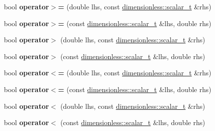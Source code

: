 \begin{DoxyCompactItemize}
\item 
\hypertarget{namespaceunits_a11d1606e46e95ed9fc8fd58019446e34}{}bool {\bfseries operator$>$=} (double lhs, const \hyperlink{classunits_1_1unit__t}{dimensionless\+::scalar\+\_\+t} \&rhs)\label{namespaceunits_a11d1606e46e95ed9fc8fd58019446e34}

\item 
\hypertarget{namespaceunits_ae5b1cb8ea6d39cdabe0216cbdd71f2a5}{}bool {\bfseries operator$>$=} (const \hyperlink{classunits_1_1unit__t}{dimensionless\+::scalar\+\_\+t} \&lhs, double rhs)\label{namespaceunits_ae5b1cb8ea6d39cdabe0216cbdd71f2a5}

\item 
\hypertarget{namespaceunits_a57fd46e74e12a209cfe126906f5ca39d}{}bool {\bfseries operator$>$} (double lhs, const \hyperlink{classunits_1_1unit__t}{dimensionless\+::scalar\+\_\+t} \&rhs)\label{namespaceunits_a57fd46e74e12a209cfe126906f5ca39d}

\item 
\hypertarget{namespaceunits_af44463877cdb370f1f8a306ef9a78aa8}{}bool {\bfseries operator$>$} (const \hyperlink{classunits_1_1unit__t}{dimensionless\+::scalar\+\_\+t} \&lhs, double rhs)\label{namespaceunits_af44463877cdb370f1f8a306ef9a78aa8}

\item 
\hypertarget{namespaceunits_a29f05d6980d76f6d15e41f5f698cc9dc}{}bool {\bfseries operator$<$=} (double lhs, const \hyperlink{classunits_1_1unit__t}{dimensionless\+::scalar\+\_\+t} \&rhs)\label{namespaceunits_a29f05d6980d76f6d15e41f5f698cc9dc}

\item 
\hypertarget{namespaceunits_a6edc757d8bf05fa01299dd47959537f2}{}bool {\bfseries operator$<$=} (const \hyperlink{classunits_1_1unit__t}{dimensionless\+::scalar\+\_\+t} \&lhs, double rhs)\label{namespaceunits_a6edc757d8bf05fa01299dd47959537f2}

\item 
\hypertarget{namespaceunits_adf632a607c4b4bd61e53f2773802a79b}{}bool {\bfseries operator$<$} (double lhs, const \hyperlink{classunits_1_1unit__t}{dimensionless\+::scalar\+\_\+t} \&rhs)\label{namespaceunits_adf632a607c4b4bd61e53f2773802a79b}

\item 
\hypertarget{namespaceunits_a26f492bedf875f41c348fe9c182ef94d}{}bool {\bfseries operator$<$} (const \hyperlink{classunits_1_1unit__t}{dimensionless\+::scalar\+\_\+t} \&lhs, double rhs)\label{namespaceunits_a26f492bedf875f41c348fe9c182ef94d}


\end{DoxyCompactItemize}
